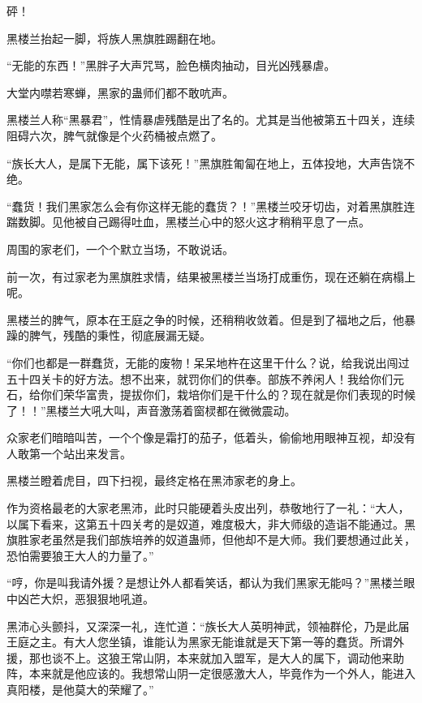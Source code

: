 
\begin{this_body}

砰！

黑楼兰抬起一脚，将族人黑旗胜踢翻在地。

“无能的东西！”黑胖子大声咒骂，脸色横肉抽动，目光凶残暴虐。

大堂内噤若寒蝉，黑家的蛊师们都不敢吭声。

黑楼兰人称“黑暴君”，性情暴虐残酷是出了名的。尤其是当他被第五十四关，连续阻碍六次，脾气就像是个火药桶被点燃了。

“族长大人，是属下无能，属下该死！”黑旗胜匍匐在地上，五体投地，大声告饶不绝。

“蠢货！我们黑家怎么会有你这样无能的蠢货？！”黑楼兰咬牙切齿，对着黑旗胜连踹数脚。见他被自己踢得吐血，黑楼兰心中的怒火这才稍稍平息了一点。

周围的家老们，一个个默立当场，不敢说话。

前一次，有过家老为黑旗胜求情，结果被黑楼兰当场打成重伤，现在还躺在病榻上呢。

黑楼兰的脾气，原本在王庭之争的时候，还稍稍收敛着。但是到了福地之后，他暴躁的脾气，残酷的秉性，彻底展漏无疑。

“你们也都是一群蠢货，无能的废物！呆呆地杵在这里干什么？说，给我说出闯过五十四关卡的好方法。想不出来，就罚你们的供奉。部族不养闲人！我给你们元石，给你们荣华富贵，提拔你们，栽培你们是干什么的？现在就是你们表现的时候了！！”黑楼兰大吼大叫，声音激荡着窗棂都在微微震动。

众家老们暗暗叫苦，一个个像是霜打的茄子，低着头，偷偷地用眼神互视，却没有人敢第一个站出来发言。

黑楼兰瞪着虎目，四下扫视，最终定格在黑沛家老的身上。

作为资格最老的大家老黑沛，此时只能硬着头皮出列，恭敬地行了一礼：“大人，以属下看来，这第五十四关考的是奴道，难度极大，非大师级的造诣不能通过。黑旗胜家老虽然是我们部族培养的奴道蛊师，但他却不是大师。我们要想通过此关，恐怕需要狼王大人的力量了。”

“哼，你是叫我请外援？是想让外人都看笑话，都认为我们黑家无能吗？”黑楼兰眼中凶芒大炽，恶狠狠地吼道。

黑沛心头颤抖，又深深一礼，连忙道：“族长大人英明神武，领袖群伦，乃是此届王庭之主。有大人您坐镇，谁能认为黑家无能谁就是天下第一等的蠢货。所谓外援，那也谈不上。这狼王常山阴，本来就加入盟军，是大人的属下，调动他来助阵，本来就是他应该的。我想常山阴一定很感激大人，毕竟作为一个外人，能进入真阳楼，是他莫大的荣耀了。”


\end{this_body}
